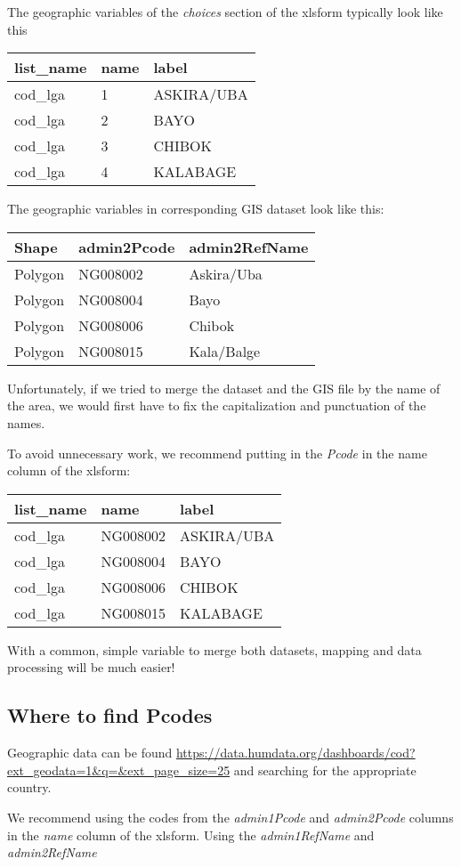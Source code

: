 \documentclass[
]{article}
\begin{document}
The geographic variables of the \emph{choices} section of the xlsform typically look like this

\begin{longtable}[]{@{}lll@{}}
\toprule
list\_name & name & label\tabularnewline
\midrule
\endhead
cod\_lga & 1 & ASKIRA/UBA\tabularnewline
cod\_lga & 2 & BAYO\tabularnewline
cod\_lga & 3 & CHIBOK\tabularnewline
cod\_lga & 4 & KALABAGE\tabularnewline
\bottomrule
\end{longtable}

The geographic variables in corresponding GIS dataset look like this:

\begin{longtable}[]{@{}lll@{}}
\toprule
Shape & admin2Pcode & admin2RefName\tabularnewline
\midrule
\endhead
Polygon & NG008002 & Askira/Uba\tabularnewline
Polygon & NG008004 & Bayo\tabularnewline
Polygon & NG008006 & Chibok\tabularnewline
Polygon & NG008015 & Kala/Balge\tabularnewline
\bottomrule
\end{longtable}

Unfortunately, if we tried to merge the dataset and the GIS file by the name of the area, we would first have to fix the capitalization and punctuation of the names.

To avoid unnecessary work, we recommend putting in the \emph{Pcode} in the name column of the xlsform:

\begin{longtable}[]{@{}lll@{}}
\toprule
list\_name & name & label\tabularnewline
\midrule
\endhead
cod\_lga & NG008002 & ASKIRA/UBA\tabularnewline
cod\_lga & NG008004 & BAYO\tabularnewline
cod\_lga & NG008006 & CHIBOK\tabularnewline
cod\_lga & NG008015 & KALABAGE\tabularnewline
\bottomrule
\end{longtable}

With a common, simple variable to merge both datasets, mapping and data processing will be much easier!

\hypertarget{where-to-find-pcodes}{%
\subsection{Where to find Pcodes}\label{where-to-find-pcodes}}

Geographic data can be found \url{https://data.humdata.org/dashboards/cod?ext_geodata=1\&q=\&ext_page_size=25} and searching for the appropriate country.

We recommend using the codes from the \emph{admin1Pcode} and \emph{admin2Pcode} columns in the \emph{name} column of the xlsform. Using the \emph{admin1RefName} and \emph{admin2RefName}
\end{document}

